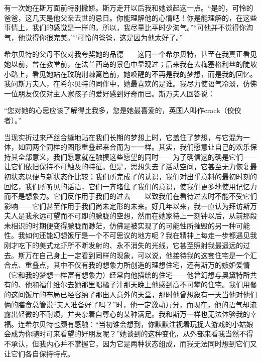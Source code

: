 \par 有一次她在斯万面前特别撒娇。斯万走开以后我和她谈起这一点。“是的，可怜的爸爸，这几天是他父亲去世的忌日。你能理解他的心情吧！你是能理解的，在这些事情上，我们的感觉是一样的。所以，我尽量比平时少淘气。”“可他并不觉得你淘气，他觉得你很完美。”“可怜的爸爸，这是因为他太好了。”
\par 希尔贝特的父母不仅对我夸奖她的品德——这同一个希尔贝特，甚至在我真正看见她以前，曾在教堂前，在法兰西岛的景色中显现过；后来我在去梅塞格利丝的陡坡小路上，看见她站在玫瑰荆棘篱笆前，她唤醒的不再是我的梦想，而是我的回忆。我问斯万夫人，在希尔贝特的同伴中，她最喜欢的是谁。我尽力使语气冷淡，仿佛一位朋友仅仅对主人家孩子的爱好感到好奇而已。斯万夫人回答说：
\par “您对她的心思应该了解得比我多，您是她最喜爱的，英国人叫作crack（佼佼者）。”
\par 当现实折过来严丝合缝地贴在我们长期的梦想上时，它盖住了梦想，与它混为一体，如同两个同样的图形重叠起来合而为一一样。其实，我们愿意让自己的欢乐保持其全部意义，我们愿意就在触摸这些愿望的同时——为了确信这的确是它们——让它们依旧保持不可触及的特征。但是，思想失去了活动空间，它甚至无力恢复最初状态以便与新状态作比较；我们所完成了的认识，我们对出乎意料的最初时刻的回忆，我们所听见的话语，它们一齐堵住了我们的意识，使我们更多地使用记忆力而不是想象力。它们反作用于我们的过去——以致我们在看待过去时不能不受它们影响——它们甚至作用于我们尚未定形的未来。好几年以来，我一直认为拜访斯万夫人是我永远可望而不可即的朦胧的空想，然而在她家待上一刻钟以后，从前那段未相识的时期便变得朦胧而渺茫，仿佛是被实现了的可能性所摧毁的另一种可能性。我如何还能幻想饭厅是一个不可思议的地方呢？我在精神上每走一步都遇见我刚才吃下的美式龙虾所不断发射的、永不消失的光线，它甚至照射我最遥远的过去。斯万在自己身上一定看到同样的现象，可以说，他接待我的这套住宅是一个汇合点、重叠点，其中不仅有我的想象力所创造的理想住宅，还有斯万的嫉妒爱情（它和我的梦想一样富有想象力）经常向他描绘的住宅——他曾幻想与奥黛特所共有的、他和福什维尔去她那里喝橘子汁那天晚上他感到高不可攀的住宅。我们用餐的这间饭厅的布局已经容纳了那出人意外的天堂，那时他曾想象有一天当他对他们俩的膳食总管说“夫人准备好了吗？”时，他一定激动万分，而现在，他的语气却流露出轻微的不耐烦，并夹杂着自尊心的某种满足。我和斯万一样也无法体验我的幸福。连希尔贝特也颇有感触：“当初谁会想到，你默默注视着玩捉人游戏的小姑娘会成为你随时可来看望的好朋友呢？”她谈到的这种变化，从外部来看我当然不得不承认，但我内心并不掌握它，因为它是两种状态组成，而我无法同时想到它们又让它们各自保持特点。
